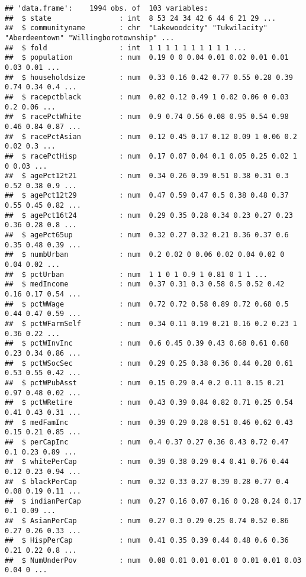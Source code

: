 \documentclass[
]{article}
\begin{document}
\begin{verbatim}
## 'data.frame':    1994 obs. of  103 variables:
##  $ state                : int  8 53 24 34 42 6 44 6 21 29 ...
##  $ communityname        : chr  "Lakewoodcity" "Tukwilacity" "Aberdeentown" "Willingborotownship" ...
##  $ fold                 : int  1 1 1 1 1 1 1 1 1 1 ...
##  $ population           : num  0.19 0 0 0.04 0.01 0.02 0.01 0.01 0.03 0.01 ...
##  $ householdsize        : num  0.33 0.16 0.42 0.77 0.55 0.28 0.39 0.74 0.34 0.4 ...
##  $ racepctblack         : num  0.02 0.12 0.49 1 0.02 0.06 0 0.03 0.2 0.06 ...
##  $ racePctWhite         : num  0.9 0.74 0.56 0.08 0.95 0.54 0.98 0.46 0.84 0.87 ...
##  $ racePctAsian         : num  0.12 0.45 0.17 0.12 0.09 1 0.06 0.2 0.02 0.3 ...
##  $ racePctHisp          : num  0.17 0.07 0.04 0.1 0.05 0.25 0.02 1 0 0.03 ...
##  $ agePct12t21          : num  0.34 0.26 0.39 0.51 0.38 0.31 0.3 0.52 0.38 0.9 ...
##  $ agePct12t29          : num  0.47 0.59 0.47 0.5 0.38 0.48 0.37 0.55 0.45 0.82 ...
##  $ agePct16t24          : num  0.29 0.35 0.28 0.34 0.23 0.27 0.23 0.36 0.28 0.8 ...
##  $ agePct65up           : num  0.32 0.27 0.32 0.21 0.36 0.37 0.6 0.35 0.48 0.39 ...
##  $ numbUrban            : num  0.2 0.02 0 0.06 0.02 0.04 0.02 0 0.04 0.02 ...
##  $ pctUrban             : num  1 1 0 1 0.9 1 0.81 0 1 1 ...
##  $ medIncome            : num  0.37 0.31 0.3 0.58 0.5 0.52 0.42 0.16 0.17 0.54 ...
##  $ pctWWage             : num  0.72 0.72 0.58 0.89 0.72 0.68 0.5 0.44 0.47 0.59 ...
##  $ pctWFarmSelf         : num  0.34 0.11 0.19 0.21 0.16 0.2 0.23 1 0.36 0.22 ...
##  $ pctWInvInc           : num  0.6 0.45 0.39 0.43 0.68 0.61 0.68 0.23 0.34 0.86 ...
##  $ pctWSocSec           : num  0.29 0.25 0.38 0.36 0.44 0.28 0.61 0.53 0.55 0.42 ...
##  $ pctWPubAsst          : num  0.15 0.29 0.4 0.2 0.11 0.15 0.21 0.97 0.48 0.02 ...
##  $ pctWRetire           : num  0.43 0.39 0.84 0.82 0.71 0.25 0.54 0.41 0.43 0.31 ...
##  $ medFamInc            : num  0.39 0.29 0.28 0.51 0.46 0.62 0.43 0.15 0.21 0.85 ...
##  $ perCapInc            : num  0.4 0.37 0.27 0.36 0.43 0.72 0.47 0.1 0.23 0.89 ...
##  $ whitePerCap          : num  0.39 0.38 0.29 0.4 0.41 0.76 0.44 0.12 0.23 0.94 ...
##  $ blackPerCap          : num  0.32 0.33 0.27 0.39 0.28 0.77 0.4 0.08 0.19 0.11 ...
##  $ indianPerCap         : num  0.27 0.16 0.07 0.16 0 0.28 0.24 0.17 0.1 0.09 ...
##  $ AsianPerCap          : num  0.27 0.3 0.29 0.25 0.74 0.52 0.86 0.27 0.26 0.33 ...
##  $ HispPerCap           : num  0.41 0.35 0.39 0.44 0.48 0.6 0.36 0.21 0.22 0.8 ...
##  $ NumUnderPov          : num  0.08 0.01 0.01 0.01 0 0.01 0.01 0.03 0.04 0 ...

\end{verbatim}
\end{document}
